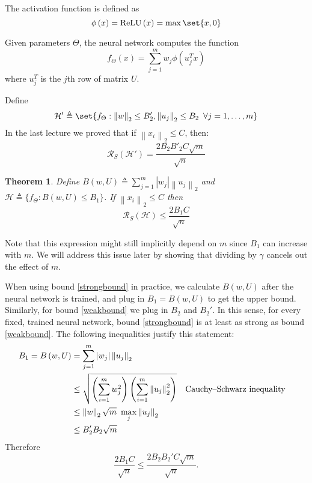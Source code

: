 \documentclass[11pt]{article}
\newtheorem{theorem}{Theorem}
\newcommand{\HH}{\mathcal{H}}
\newcommand{\RR}{\mathcal{R}}
\newcommand{\normt}[1]{\left\lVert#1\right\rVert_2}
\newcommand{\abs}[1]{\left\lvert#1\right\rvert}
\DeclarePairedDelimiter\set\{\}
\begin{document}
The activation function is defined as
$$\phi\left(x\right) = {\rm ReLU}\left(x\right)=\max\set{x, 0}$$

Given parameters $\Theta$, the neural network computes the function
$$f_\Theta\left(x\right)= \sum\limits_{j=1}^{m} w_{j} \phi\left(u_{j}^{T}x\right)$$
where $u_j^T$ is the $j$th row of matrix $U$.

Define
$$\HH' \triangleq \set{f_\Theta : \normt{w} \leq B'_2, \normt{u_j} \leq B_2 \enskip \forall j=1, \dotsc, m}$$
In the last lecture we proved that if $\normt{x_i} \leq C$, then:
\begin{equation}
	\label{weakbound}
	\RR_S(\HH')=\frac{2 B_2 B'_2 C \sqrt{m}}{\sqrt{n}}
\end{equation}



\begin{theorem}
	\label{bound}
	Define $B(w, U) \triangleq \sum\limits_{j=1}^{m} \abs{w_j} \normt{u_j}$ and
	$\HH \triangleq \{f_\Theta: B(w, U) \leq B_1 \}$. If $\normt{x_i} \leq C$
	then
	\begin{equation}
		\label{strongbound}
		\RR_S(\HH) \leq \frac{2 B_1 C}{\sqrt{n}}
	\end{equation}
	
\end{theorem}
Note that this expression might still implicitly depend on $m$ since $B_1$ can increase with $m$.
We will address this issue later by showing that dividing by $\gamma$ cancels out
the effect of $m$.

When using bound \ref{strongbound} in practice, we calculate $B(w, U)$ after the neural network
is trained, and plug in $B_1=B(w,U)$ to get the upper bound. Similarly, for bound  \ref{weakbound}
we plug in $B_2$ and $B_2'$. In this sense, for every fixed, trained neural network,
bound \ref{strongbound} is at least as strong as bound \ref{weakbound}.
The following inequalities justify this statement:
\begin{align*}
	B_1=B\left(w, U\right) & = \sum\limits_{j=1}^{m} \abs{w_j} \normt{u_j}                                                                    \\
				& \leq \sqrt{\left(\sum\limits_{i=1}^m w_j^2\right)
				\left(\sum\limits_{i=1}^m \normt{u_j}^2\right)} && \text{Cauchy–Schwarz inequality} \\
	            & \leq \normt{w} \sqrt{m} \enskip \underset{j}{\max} \normt{u_j}                                                           \\
	            & \leq B'_2 B_2 \sqrt{m}
\end{align*}
Therefore
$$\frac{2B_1C}{\sqrt{n}} \leq \frac{2B_2B_2'C\sqrt{m}}{\sqrt{n}}.$$
\end{document}

